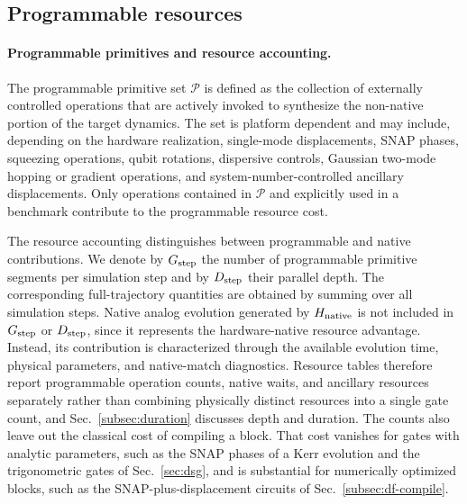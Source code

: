 \documentclass[pra,twocolumn,superscriptaddress,nofootinbib,floatfix]{revtex4-2}
\theoremstyle{remark}
\begin{document}
\subsection{Programmable resources}
\label{subsec:resources}

\paragraph{Programmable primitives and resource accounting.}
The programmable primitive set \(\mathcal P\) is defined as the collection of externally controlled operations that are actively invoked to synthesize the non-native portion of the target dynamics. The set is platform dependent and may include, depending on the hardware realization, single-mode displacements, SNAP phases, squeezing operations, qubit rotations, dispersive controls, Gaussian two-mode hopping or gradient operations, and system-number-controlled ancillary displacements. Only operations contained in \(\mathcal P\) and explicitly used in a benchmark contribute to the programmable resource cost.

The resource accounting distinguishes between programmable and native contributions. We denote by \(G_{\rm step}\) the number of programmable primitive segments per simulation step and by \(D_{\rm step}\) their parallel depth. The corresponding full-trajectory quantities are obtained by summing over all simulation steps. Native analog evolution generated by \(H_{\rm native}\) is not included in \(G_{\rm step}\) or \(D_{\rm step}\), since it represents the hardware-native resource advantage. Instead, its contribution is characterized through the available evolution time, physical parameters, and native-match diagnostics. Resource tables therefore report programmable operation counts, native waits, and ancillary resources separately rather than combining physically distinct resources into a single gate count, and Sec.~\ref{subsec:duration} discusses depth and duration. The counts also leave out the classical cost of compiling a block. That cost vanishes for gates with analytic parameters, such as the SNAP phases of a Kerr evolution and the trigonometric gates of Sec.~\ref{sec:dsg}, and is substantial for numerically optimized blocks, such as the SNAP-plus-displacement circuits of Sec.~\ref{subsec:df-compile}.
\end{document}
